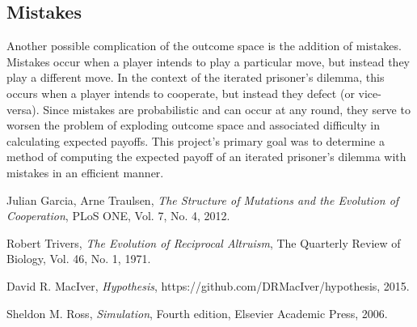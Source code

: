 \documentclass[a4paper,12pt]{article}
\begin{document}
\subsection*{Mistakes}

Another possible complication of the outcome space is the addition of mistakes.
Mistakes occur when a player intends to play a particular move, but instead they play a different move.
In the context of the iterated prisoner's dilemma, this occurs when a player intends to cooperate, but instead they defect (or vice-versa).
Since mistakes are probabilistic and can occur at any round, they serve to worsen the problem of exploding outcome space and associated difficulty in calculating expected payoffs.
This project's primary goal was to determine a method of computing the expected payoff of an iterated prisoner's dilemma with mistakes in an efficient manner.

\begin{thebibliography}{9}

        Julian Garcia, Arne Traulsen,
        \emph{The Structure of Mutations and the Evolution of Cooperation},
        PLoS ONE,
        Vol. 7,
        No. 4,
        2012.

        Robert Trivers,
        \emph{The Evolution of Reciprocal Altruism},
        The Quarterly Review of Biology,
        Vol. 46,
        No. 1,
        1971.

        David R. MacIver,
        \emph{Hypothesis},
        https://github.com/DRMacIver/hypothesis,
        2015.

        Sheldon M. Ross,
        \emph{Simulation},
        Fourth edition,
        Elsevier Academic Press,
        2006.

\end{thebibliography}
\end{document}
